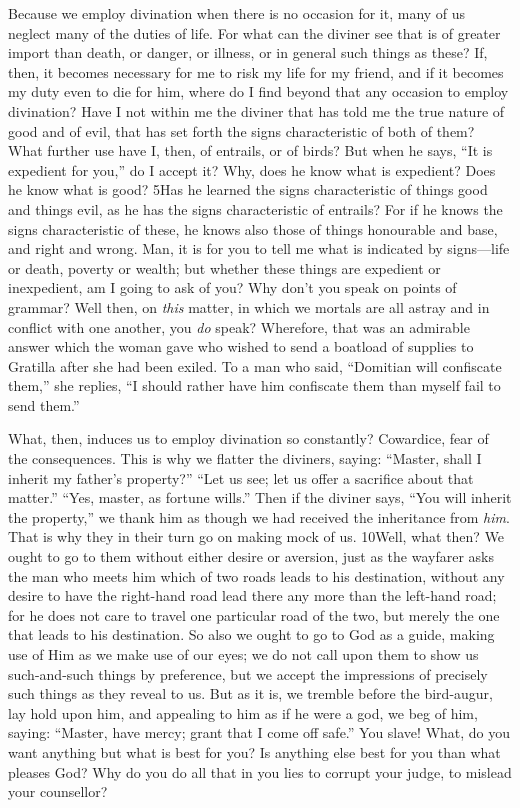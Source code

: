 Because we employ divination when there is no occasion for it, many of us neglect many of the duties of life. For what can the diviner see that is of greater import than death, or danger, or illness, or in general such things as these? If, then, it becomes necessary for me to risk my life for my friend, and if it becomes my duty even to die for him, where do I find beyond that any occasion to employ divination? Have I not within me the diviner that has told me the true nature of good and of evil, that has set forth the signs characteristic of both of them? What further use have I, then, of entrails, or of birds? But when he says, ``It is expedient for you,'' do I accept it? Why, does he know what is expedient? Does he know what is good? 5Has he learned the signs characteristic of things good and things evil, as he has the signs characteristic of entrails? For if he knows the signs characteristic of these, he knows also those of things honourable and base, and right and wrong. Man, it is for you to tell me what is indicated by signs—life or death, poverty or wealth; but whether these things are expedient or inexpedient, am I going to ask of you? Why don't you speak on points of grammar? Well then, on \emph{this} matter, in which we mortals are all astray and in conflict with one another, you \emph{do} speak? Wherefore, that was an admirable answer which the woman gave who wished to send a boatload of supplies to Gratilla after she had been exiled. To a man who said, ``Domitian will confiscate them,'' she replies, ``I should rather have him confiscate them than myself fail to send them.''

What, then, induces us to employ divination so constantly? Cowardice, fear of the consequences. This is why we flatter the diviners, saying: ``Master, shall I inherit my father's property?'' ``Let us see; let us offer a sacrifice about that matter.'' ``Yes, master, as fortune wills.'' Then if the diviner says, ``You will inherit the property,'' we thank him as though we had received the inheritance from \emph{him}. That is why they in their turn go on making mock of us. 10Well, what then? We ought to go to them without either desire or aversion, just as the wayfarer asks the man who meets him which of two roads leads to his destination, without any desire to have the right-hand road lead there any more than the left-hand road; for he does not care to travel one particular road of the two, but merely the one that leads to his destination. So also we ought to go to God as a guide, making use of Him as we make use of our eyes; we do not call upon them to show us such-and-such things by preference, but we accept the impressions of precisely such things as they reveal to us. But as it is, we tremble before the bird-augur, lay hold upon him, and appealing to him as if he were a god, we beg of him, saying: ``Master, have mercy; grant that I come off safe.'' You slave! What, do you want anything but what is best for you? Is anything else best for you than what pleases God? Why do you do all that in you lies to corrupt your judge, to mislead your counsellor?

